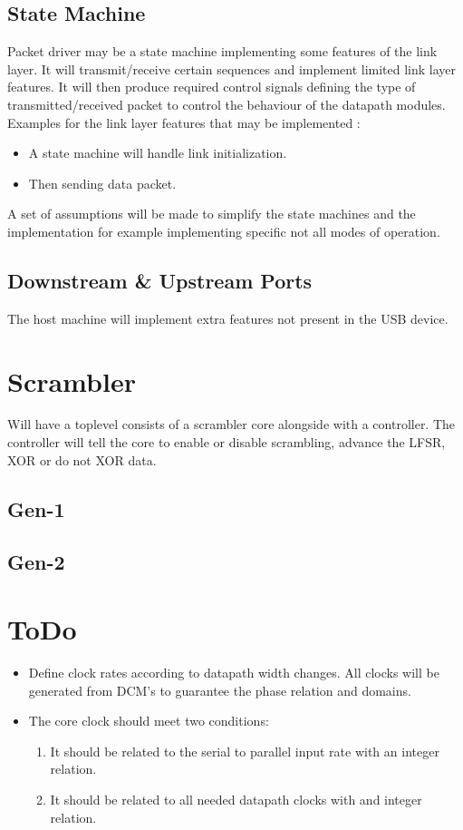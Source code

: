 \documentclass[11pt,a4paper]{article}
\begin{document}
\subsection{State Machine}
Packet driver may be a state machine implementing some features of the link layer. It will transmit/receive certain sequences and implement limited link layer features. It will then produce required control signals defining the type of transmitted/received packet to control the behaviour of the datapath modules.
Examples for the link layer features that may be implemented :
\begin{itemize}
	\item A state machine will handle link initialization.
	\item Then sending data packet.
\end{itemize}

A set of assumptions will be made to simplify the state machines and the implementation for example implementing specific not all modes of operation.

\subsection{Downstream \& Upstream Ports}
The host machine will implement extra features not present in the USB device.


\section{Scrambler}
Will have a toplevel consists of a scrambler core alongside with a controller. The controller will tell the core to enable or disable scrambling, advance the LFSR, XOR or do not XOR data.


\subsection{Gen-1}

\subsection{Gen-2}


\section{ToDo}
\begin{itemize}
	\item Define clock rates according to datapath width changes. All clocks will be generated from DCM's to guarantee the phase relation and domains.
	\item The core clock should meet two conditions:
	\begin{enumerate}
		\item It should be related to the serial to parallel input rate with an integer relation.
		\item It should be related to all needed datapath clocks with and integer relation.
	\end{enumerate}
\end{itemize}
\end{document}
